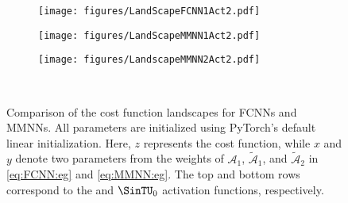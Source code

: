 \documentclass[11pt,a4paper]{article}
\begin{document}
\begin{figure}[ht]
\begin{subfigure}[b]{0.27300245\textwidth}
                    \centering            
                    \texttt{[image: figures/LandScapeFCNN1Act2.pdf]}
                \end{subfigure}
                \hfill
            \begin{subfigure}[b]{0.27300245\textwidth}
                    \centering            \texttt{[image: figures/LandScapeMMNN1Act2.pdf]}
                \end{subfigure}
                \hfill
            \begin{subfigure}[b]{0.27300245\textwidth}
                    \centering            \texttt{[image: figures/LandscapeMMNN2Act2.pdf]}
                \end{subfigure}\hfill
                \,
                
                \caption{Comparison of the cost function landscapes for FCNNs and MMNNs. All parameters are initialized using PyTorch's default linear initialization. Here, $z$ represents the cost function, while $x$ and $y$ denote two parameters  from the weights of
\({\mathcal{A}}_1\), \({\tilde{\mathcal{A}}}_1\), and \({\tilde{\mathcal{A}}}_2\) in 
 \eqref{eq:FCNN:eg} and \eqref{eq:MMNN:eg}.
The top and bottom rows correspond to the \sine{} and $\SinTU_0$ activation functions, respectively.
}


    \label{fig:landscape:FCNN:vs:MMNN}
    
\end{figure}


\end{document}
